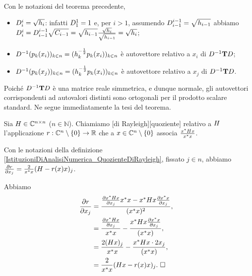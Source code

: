 \Proof Con le notazioni del teorema precedente,
\begin{itemize}
	\item $D_i^i = \sqrt{h_i}$: infatti $D_1^1 = 1$ e, per $i > 1$, assumendo $D_{i - 1}^{i - 1} = \sqrt{h_{i - 1}}$ abbiamo $D_i^i = D_{i - 1}^{i - 1}\sqrt{C_{i - 1}} = \sqrt{h_{i - 1}} \frac{\sqrt{h_i}}{\sqrt{h_{i - 1}}} = \sqrt{h_i}$;
	\item $D^{-1}(p_k(x_i))_{k \in n} = (h_k^{-\frac{1}{2}}p_k(x_i))_{k \in n}$ \`e autovettore relativo a $x_i$ di $D^{-1}\mathbf{T}D$;
	\item $D^{-1}(p_k(x_j))_{k \in n} = (h_k^{-\frac{1}{2}}p_k(x_i))_{k \in n}$ \`e autovettore relativo a $x_j$ di $D^{-1}\mathbf{T}D$.
\end{itemize}
\par Poich\'e $D^{-1}\mathbf{T}D$ \`e una matrice reale simmetrica, e dunque normale, gli autovettori corrispondenti ad autovalori distinti sono ortogonali per il prodotto scalare standard. Ne segue immediatamente la tesi del teorema. \EndProof
\begin{Definition}
	\label{IstituzioniDiAnalisiNumerica_QuozienteDiRayleigh}
	Sia $H \in \mathbb{C}^{n \times n}$ ($n \in \mathbb{N}$). Chiamiamo [di Rayleigh][quoziente] relativo a $H$ l'applicazione $r: \mathbb{C}^n \setminus \lbrace 0 \rbrace \rightarrow \mathbb{R}$ che a $x \in \mathbb{C}^n \setminus \lbrace 0 \rbrace$ associa $\frac{{x}^*H x}{{x}^*x}$.
\end{Definition}
\begin{Theorem}
	Con le notazioni della definizione \ref{IstituzioniDiAnalisiNumerica_QuozienteDiRayleigh}, fissato $j \in n$, abbiamo$\frac{\partial r}{\partial x_j} = \frac{2}{{x}^*{x}} (H - r(x)x)_j$.
\end{Theorem}
\Proof Abbiamo
\begin{align*}
	\frac{\partial r}{\partial x_j}
	&= \frac{\frac{\partial {x}^*H x}{\partial x_j} {x}^*x - {x}^*H x\frac{\partial {x}^*x}{\partial x_j}}{({x}^*x)^2},\\
	&= \frac{\frac{\partial {x}^*H x}{\partial x_j}}{{x}^*x} - \frac{{x}^*H x\frac{\partial {x}^*x}{\partial x_j}}{({x}^*x)},\\
	&= \frac{2(H x)_j}{{x}^*x} - \frac{{x}^*H x \cdot 2 x_j}{({x}^*x)},\\
	&= \frac{2}{{x}^*x} (H x - r(x)x)_j.\text{ $\square$}
\end{align*}
